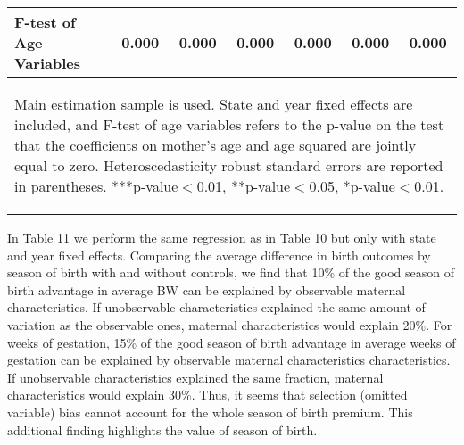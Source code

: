 \documentclass[a4paper, 11.5 pt]{article}
\theoremstyle{plain}
\begin{document}
\begin{doublespace}
\begin{table}[htbp]
\begin{tabular}{l*{6}{c}}
F-test of Age Variables&0.000&0.000&0.000&0.000&0.000&0.000 \\
\bottomrule
\multicolumn{7}{p{15cm}}{\begin{footnotesize}Main estimation
sample is used. State and year fixed effects are
included, and F-test of age variables refers to the p-value on the test that               the coefficients on mother's age and age squared are jointly               equal to zero.         Heteroscedasticity robust standard errors are reported in               parentheses.
***p-value$<$0.01, **p-value$<$0.05, *p-value$<$0.01.
\end{footnotesize}}\end{tabular}\end{table}

In Table 11 we perform the same regression as in Table 10 but only with state and year fixed effects. Comparing the average difference in birth outcomes by season of birth with and without controls, we find that 10\% of the good season of birth advantage in average BW can be explained by observable maternal characteristics. If unobservable characteristics explained the same amount of variation as the observable ones, maternal characteristics would explain 20\%. For weeks of gestation, 15\% of the good season of birth advantage in average weeks of gestation can be explained by observable maternal characteristics characteristics. If unobservable characteristics explained the same fraction, maternal characteristics would explain 30\%. Thus, it seems that selection (omitted variable) bias cannot account for the whole season of birth premium. This additional finding highlights the value of season of birth.  


\end{doublespace}
\end{document}
